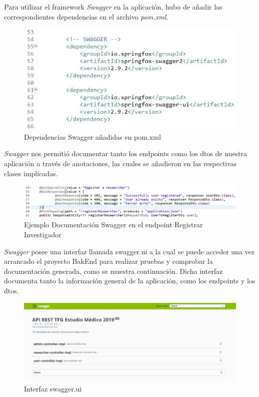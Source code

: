         Para utilizar el framework \textit{Swagger} en la aplicación, hubo de añadir las correspondientes dependencias en el archivo \textit{pom.xml}.
        \newline
        
        \begin{figure}[h]
            \centering
            \includegraphics[width=1\textwidth]{images/swagger.JPG}
            \caption{Dependencias Swagger añadidas en pom.xml}
        \end{figure}
        
        \textit{Swagger} nos permitió documentar tanto los endpoints como los dtos de nuestra aplicación a través de anotaciones, las cuales se añadieron en las respectivas clases implicadas.
        
          \begin{figure}[h]
            \centering
            \includegraphics[width=1\textwidth]{images/swaggerexample.JPG}
            \caption{Ejemplo Documentación Swagger en el endpoint Registrar Investigador}
        \end{figure}
        
        
         \textit{Swagger} posee una interfaz llamada swagger.ui a la cual se puede acceder una vez arrancado el proyecto BakEnd para realizar pruebas y comprobar la documentación generada, como se muestra continuación. Dicha interfaz documenta tanto la información general de la aplicación, como los endpoints y los dtos.
         \newline
         
          \begin{figure}[h]
            \centering
            \includegraphics[width=1\textwidth]{images/swaggergeneral.JPG}
            \caption{Interfaz swagger.ui}
        \end{figure}
        
